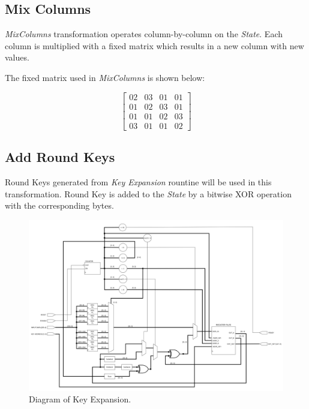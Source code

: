 \documentclass[a4paper, 10pt]{article}
\begin{document}
\begin{multicols}{2}
            \subsection{Mix Columns}

            \textit{MixColumns} transformation operates column-by-column on the \textit{State}. Each column is multiplied with a fixed matrix which results in a new column with new values.

            The fixed matrix used in \textit{MixColumns} is shown below:

            \begin{equation}
            \begin{bmatrix}
                02 & 03 & 01 & 01\\
                01 & 02 & 03 & 01\\
                01 & 01 & 02 & 03\\
                03 & 01 & 01 & 02
            \end{bmatrix}
        \end{equation}

            \subsection{Add Round Keys}

            Round Keys generated from \textit{Key Expansion} rountine will be used in this transformation. Round Key is added to the \textit{State} by a bitwise XOR operation with the corresponding bytes.
        \end{multicols}
    
        \noindent
        \begin{figure}[t]
            \centering
            \includegraphics[width=\textwidth]{KeyExpansion.png}
            \caption{Diagram of Key Expansion.}
            \label{fig:KeyExpansion}
        \end{figure}
\end{document}
